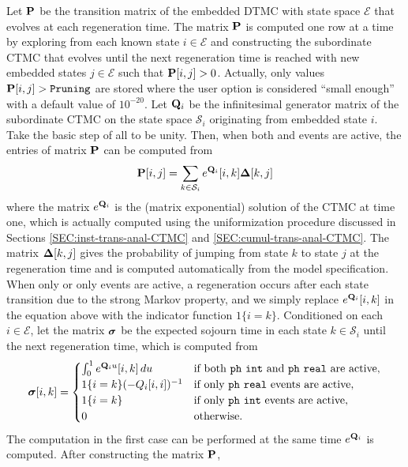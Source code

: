 Let $\P$ be the transition matrix of the embedded DTMC with state space $\mathcal{E}$
that evolves at each regeneration time.
The matrix $\P$ is computed one row at a time by exploring from each known state $i\in\mathcal{E}$
and constructing the subordinate CTMC that evolves until the next regeneration time is reached
with new embedded states $j\in\mathcal{E}$ such that $\P[i, j]>0$.
Actually, only values $\P[i, j] > \Code{Pruning}$ are stored where the
user option  is
considered ``small enough'' with a default value of $10^{-20}$.
Let $\Q_i$ be the infinitesimal generator matrix of the subordinate CTMC on the state space
$\mathcal{S}_i$ originating from embedded state $i$.  Take the basic step of all 
to be unity.  Then, when both  and  events are active,
the entries of matrix $\P$ can be computed from
\[
  \P[i, j] = \sum_{k\in\mathcal{S}_i} e^{\Q_i}[i, k] \matr{\Delta}[k, j]
\]
where the matrix $e^{\Q_i}$ is the (matrix exponential) solution of the CTMC at time one,
which is actually computed using the uniformization
procedure discussed in Sections \ref{SEC:inst-trans-anal-CTMC} and \ref{SEC:cumul-trans-anal-CTMC}.
The matrix $\matr{\Delta}[k, j]$ gives the probability of jumping from state $k$ to state $j$
at the regeneration time and is computed automatically from the model specification.
When only  or only  events are active,
a regeneration occurs after each state transition due to the strong Markov property, and we
simply replace $e^{\Q_i}[i, k]$ in the equation above with the indicator function $1\{i=k\}$.
Conditioned on each $i\in\mathcal{E}$, let the matrix $\gvect{\sigma}$ be the expected sojourn time
in each state $k\in\mathcal{S}_i$ until the next regeneration time, which is computed from
\[
  \gvect{\sigma}[i, k] =
  \begin{cases}
    \int_{0}^{1} e^{\Q_i u}[i, k]\,du
                               & \text{if both \Code{ph\! int} and \Code{ph\! real} are active}, \\
    1\{i=k\} (-Q_i[i, i])^{-1} & \text{if only \Code{ph\! real} events are active}, \\
    1\{i=k\}                   & \text{if only \Code{ph\! int} events are active},  \\
    0                          & \text{otherwise}.
  \end{cases}
\]
The computation in the first case can be performed at the same time $e^{\Q_i}$ is computed.
After constructing the matrix $\P$,
